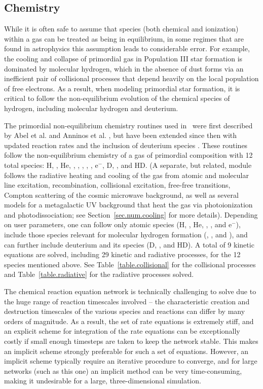 \subsection{Chemistry}
\label{sec.num.chemistry}

While it is often safe to assume that species (both chemical and
ionization) within a gas can be treated as being in equilibrium, in
some regimes that are found in astrophysics this assumption leads to
considerable error.  For example, the cooling and collapse of
primordial gas in Population III star formation is dominated by
molecular hydrogen, which in the absence of dust forms via an
inefficient pair of collisional processes that depend heavily on the
local population of free electrons.  As a result, when modeling
primordial star formation, it is critical to follow the
non-equilibrium evolution of the chemical species of hydrogen,
including molecular hydrogen and deuterium.

The primordial non-equilibrium chemistry routines used in \enzo\ were
first described by Abel et al. and Anninos et
al. \citep{abel97,anninos97}, but have been extended since then with
updated reaction rates and the inclusion of deuterium species
\citep{2009PhDT.........5T}.  These routines follow the
non-equilibrium chemistry of a gas of primordial composition with 12
total species: H, \Hp, He, \Hep, \Hepp, \Hm, \HHp, \HH, e$^-$, D, \Dp,
and HD.  (A separate, but related, module follows the radiative
heating and cooling of the gas from atomic and molecular line
excitation, recombination, collisional excitation, free-free
transitions, Compton scattering of the cosmic microwave background, as
well as several models for a metagalactic UV background that heat the
gas via photoionization and photodissociation; see
Section~\ref{sec.num.cooling} for more details).  Depending on user
parameters, one can follow only atomic species (H, \Hp, He, \Hep,
\Hepp, and e$^-$), include those species relevant for molecular
hydrogen formation (\HH, \HHp, and \Hm), and can further include
deuterium and its species (D, \Dp, and HD).  A total of 9 kinetic
equations are solved, including 29 kinetic and radiative processes,
for the 12 species mentioned above.  See Table~\ref{table.collisional}
for the collisional processes and Table~\ref{table.radiative} for the
radiative processes solved.

The chemical reaction equation network is technically challenging to
solve due to the huge range of reaction timescales involved -- the
characteristic creation and destruction timescales of the various
species and reactions can differ by many orders of magnitude.  As a
result, the set of rate equations is extremely stiff, and an explicit
scheme for integration of the rate equations can be exceptionally
costly if small enough timesteps are taken to keep the network stable.
This makes an implicit scheme strongly preferable for such a set of
equations.  However, an implicit scheme typically require an iterative
procedure to converge, and for large networks (such as this one) an
implicit method can be very time-consuming, making it undesirable for
a large, three-dimensional simulation.

